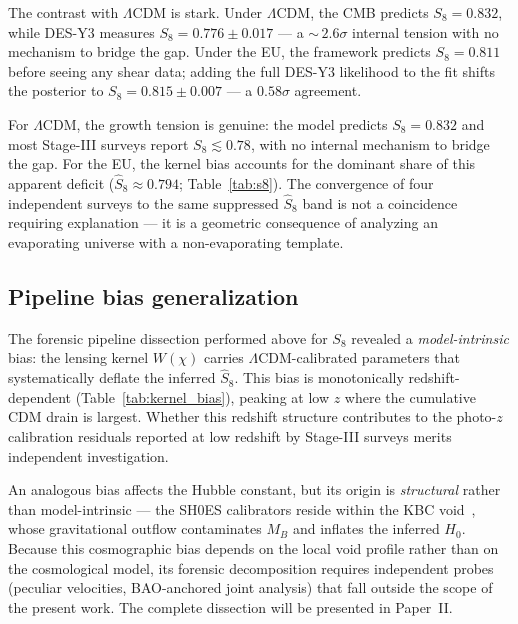 \documentclass[a4paper,fleqn]{cas-dc}
\begin{document}
The contrast with $\Lambda$CDM is stark. Under
$\Lambda$CDM, the CMB predicts $S_8 = 0.832$, while
DES-Y3 measures $S_8 = 0.776 \pm 0.017$ --- a
${\sim}\,2.6\sigma$ internal tension with no mechanism
to bridge the gap. Under the EU, the framework predicts
$S_8 = 0.811$ before seeing any shear data; adding the
full DES-Y3 likelihood to the fit shifts the posterior
to $S_8 = 0.815 \pm 0.007$ --- a $0.58\sigma$
agreement.

For $\Lambda$CDM, the growth tension is genuine: the
model predicts $S_8 = 0.832$ and most Stage-III
surveys report $S_8 \lesssim 0.78$, with no internal
mechanism to bridge the gap. For the EU, the kernel
bias accounts for the dominant share of this apparent
deficit ($\hat{S}_8 \approx 0.794$;
Table~\ref{tab:s8}). The convergence of four
independent surveys to the same suppressed
$\hat{S}_8$ band is not a coincidence requiring
explanation --- it is a geometric consequence of
analyzing an evaporating universe with a
non-evaporating template.

\subsection{Pipeline bias generalization}
\label{sec:pipeline_bias}

The forensic pipeline dissection performed above for $S_8$
revealed a \emph{model-intrinsic} bias: the lensing kernel
$W(\chi)$ carries $\Lambda$CDM-calibrated parameters that
systematically deflate the inferred $\hat{S}_8$.
This bias is monotonically redshift-dependent
(Table~\ref{tab:kernel_bias}), peaking at low $z$ where the
cumulative CDM drain is largest. Whether this redshift
structure contributes to the photo-$z$ calibration residuals
reported at low redshift by Stage-III surveys merits
independent investigation.

An analogous bias affects the Hubble constant, but its origin
is \emph{structural} rather than model-intrinsic --- the
SH0ES calibrators reside within the KBC
void~\cite{keenan2013}, whose gravitational outflow
contaminates $M_B$ and inflates the inferred $H_0$.
Because this cosmographic bias depends on the local void
profile rather than on the cosmological model, its forensic
decomposition requires independent probes (peculiar
velocities, BAO-anchored joint analysis) that fall outside
the scope of the present work.
The complete dissection will be presented in Paper~II.
\end{document}
